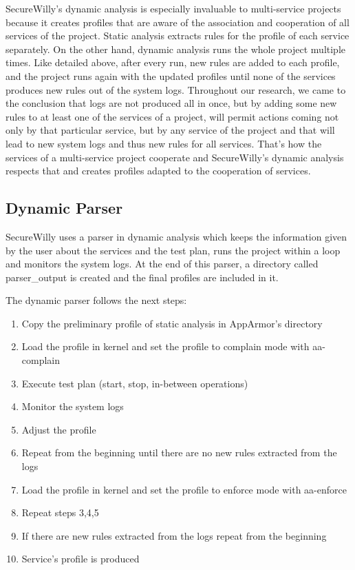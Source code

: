 SecureWilly's dynamic analysis is especially invaluable to multi-service projects because it creates profiles that are aware of the association and cooperation of all services of the project. Static analysis extracts rules for the profile of each service separately. On the other hand, dynamic analysis runs the whole project multiple times. Like detailed above, after every run, new rules are added to each profile, and the project runs again with the updated profiles until none of the services produces new rules out of the system logs. Throughout our research, we came to the conclusion that logs are not produced all in once, but by adding some new rules to at least one of the services of a project, will permit actions coming not only by that particular service, but by any service of the project and that will lead to new system logs and thus new rules for all services. That's how the services of a multi-service project cooperate and SecureWilly's dynamic analysis respects that and creates profiles adapted to the cooperation of services.

\subsection{Dynamic Parser}
SecureWilly uses a parser in dynamic analysis which keeps the information given by the user about the services and the test plan, runs the project within a loop and monitors the system logs. At the end of this parser, a directory called parser\_output is created and the final profiles are included in it.

The dynamic parser follows the next steps:
\begin{enumerate}
\item Copy the preliminary profile of static analysis in AppArmor's directory
\item Load the profile in kernel and set the profile to complain mode with aa-complain
\item Execute test plan (start, stop, in-between operations)
\item Monitor the system logs
\item Adjust the profile
\item Repeat from the beginning until there are no new rules extracted from the logs
\item Load the profile in kernel and set the profile to enforce mode with aa-enforce
\item Repeat steps 3,4,5
\item If there are new rules extracted from the logs repeat from the beginning
\item Service's profile is produced
\end{enumerate}

